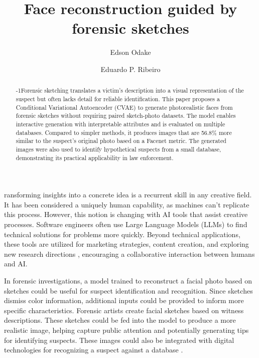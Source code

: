 \documentclass{IEEEcsmag}
\begin{document}

\title{Face reconstruction guided by forensic sketches}

\author{Edson Odake}

\author{Eduardo P. Ribeiro}


\begin{abstract}\looseness-1Forensic sketching translates a victim's description into a visual representation of the suspect but often lacks detail for reliable identification. This paper proposes a Conditional Variational Autoencoder (CVAE) to generate photorealistic faces from forensic sketches without requiring paired sketch-photo datasets. The model enables interactive generation with interpretable attributes and is evaluated on multiple databases. Compared to simpler methods, it produces images that are 56.8\% more similar to the suspect's original photo based on a Facenet metric. The generated images were also used to identify hypothetical suspects from a small database, demonstrating its practical applicability in law enforcement.
\end{abstract}

\maketitle

ransforming insights into a concrete idea is a recurrent skill in any creative field. It has been considered a uniquely human capability, as machines can't replicate this process. However, this notion is changing with AI tools that assist creative processes. Software engineers often use Large Language Models (LLMs) to find technical solutions for problems more quickly. Beyond technical applications, these tools are utilized for marketing strategies, content creation, and exploring new research directions \cite{10.1145/3613904.3642698}, encouraging a collaborative interaction between humans and AI.

In forensic investigations, a model trained to reconstruct a facial photo based on sketches could be useful for suspect identification and recognition. Since sketches dismiss color information, additional inputs could be provided to inform more specific characteristics. Forensic artists create facial sketches based on witness descriptions. These sketches could be fed into the model to produce a more realistic image, helping capture public attention and potentially generating tips for identifying suspects. These images could also be integrated with digital technologies for recognizing a suspect against a database \cite{devakumar_forensic_2023}.
\end{document}
